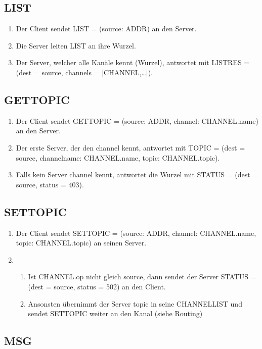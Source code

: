 \documentclass{article}
\begin{document}
\subsection{LIST}

\begin{enumerate}
  \item Der Client sendet LIST = (source: ADDR) an den Server.
  \item Die Server leiten LIST an ihre Wurzel. 
  \item Der Server, welcher alle Kanäle kennt (Wurzel), antwortet mit LISTRES = (dest = source, channels = [CHANNEL,\ldots]).
\end{enumerate}

\subsection{GETTOPIC}

\begin{enumerate}
  \item Der Client sendet GETTOPIC = (source: ADDR, channel: CHANNEL.name) an den Server.
  \item Der erste Server, der den channel kennt, antwortet mit TOPIC = (dest = source, channelname: CHANNEL.name, topic: CHANNEL.topic).
  \item Falls kein Server channel kennt, antwortet die Wurzel mit STATUS = (dest = source, status = 403).
\end{enumerate}

\subsection{SETTOPIC}

\begin{enumerate}
  \item Der Client sendet SETTOPIC = (source: ADDR, channel: CHANNEL.name, topic: CHANNEL.topic) an seinen Server.
  \item
    \begin{enumerate}
      \item Ist CHANNEL.op nicht gleich source, dann sendet der Server STATUS = (dest = source, status = 502) an den Client.
      \item Ansonsten übernimmt der Server topic in seine CHANNELLIST und sendet SETTOPIC weiter an den Kanal (siehe Routing)
    \end{enumerate}
\end{enumerate}

\subsection{MSG}
\end{document}
